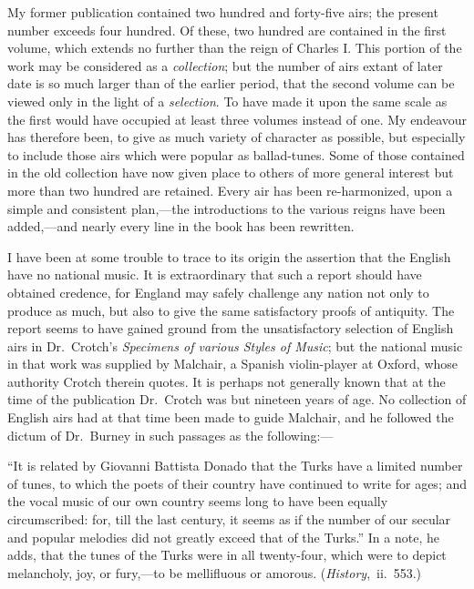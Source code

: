 My former publication contained two hundred and forty-five airs; the present
number exceeds four hundred. Of these, two hundred are contained in the first
volume, which extends no further than the reign of Charles I. This portion of
the work may be considered as a \textit{collection}; but the number of airs extant of later
date is so much larger than of the earlier period, that the second volume can be
viewed only in the light of a \textit{selection}. To have made it upon the same scale as the
first would have occupied at least three volumes instead of one. My endeavour
has therefore been, to give as much variety of character as possible, but especially
to include those airs which were popular as ballad-tunes. Some of those contained
in the old collection have now given place to others of more general interest but
more than two hundred are retained. Every air has been re-harmonized, upon a
simple and consistent plan,—the introductions to the various reigns have been
added,—and nearly every line in the book has been rewritten.


I have been at some trouble to trace \pagebreak to its origin the assertion that the English 
have no national music. It is extraordinary that such a report 
should have 
obtained credence, for England may safely challenge any nation not only to produce
as much, but also to give the same satisfactory proofs of antiquity. The
report seems to have gained ground from the unsatisfactory selection of English
airs in Dr.~Crotch’s \textit{Specimens of various Styles of Music}; but the national music
in that work was supplied by Malchair, a Spanish violin-player at Oxford, whose
authority Crotch therein quotes. It is perhaps not generally known that at the
time of the publication Dr.~Crotch was but nineteen years of age. No collection
of English airs had at that time been made to guide Malchair, and he followed
the dictum of Dr.~Burney in such passages as the following:—

“It is related by Giovanni Battista Donado that the Turks have a limited
number of tunes, to which the poets of their country have continued to write for
ages; and the vocal music of our own country seems long to have been equally
circumscribed: for, till the last century, it seems as if the number of our secular
and popular melodies did not greatly exceed that of the Turks.” In a note, he
adds, that the tunes of the Turks were in all twenty-four, which were to depict
melancholy, joy, or fury,—to be mellifluous or amorous. (\textit{History},~ii.~553.)

